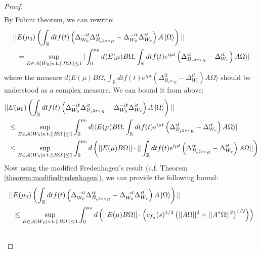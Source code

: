 \documentclass[a4paper,11pt]{article}
\theoremstyle{definition}
\newcommand{\lb}{\left(}
\newcommand{\rb}{\right)}
\begin{document}
{{\begin{proof}
\begin{align}
    \end{align}
    By Fubini theorem, we can rewrite:
    \begin{align}
        \begin{split}
            ||&E(\mu_0)\lb\int_\mathbb{R} dt f(t)\lb \Delta_{W_0}^{-it}\Delta_{B_{e^{2\pi s}R}}^{it} - \Delta_{W_0}^{-it}\Delta_{W_r}^{it} \rb A\ket{\Omega}\rb||
            \\&
            =\sup_{B\in\mathcal{A}(W_0)\text{s.t.}||B\Omega||\leq 1}|\int_0^{\mu_0} d\langle E(\mu)B\Omega, \int_\mathbb{R} dt f(t)e^{i\mu t}\lb\Delta_{B_{e^{2\pi s}R}}^{it} - \Delta_{W_r}^{it}\rb A\Omega\rangle|
        \end{split}
    \end{align}
    where the measure $d\langle E(\mu)B\Omega, \int_\mathbb{R} dt f(t)e^{i\mu t}\lb\Delta_{B_{e^{2\pi s}R}}^{it} - \Delta_{W_r}^{it}\rb A\Omega\rangle$ should be understood as a complex measure. We can bound it from above:
    \begin{align}
        \begin{split}
            ||&E(\mu_0)\lb\int_\mathbb{R} dt f(t)\lb \Delta_{W_0}^{-it}\Delta_{B_{e^{2\pi s}R}}^{it} - \Delta_{W_0}^{-it}\Delta_{W_r}^{it} \rb A\ket{\Omega}\rb||
            \\&
            \leq\sup_{B\in\mathcal{A}(W_0)\text{s.t.}||B\Omega||\leq 1}\int_0^{\mu_0} d|\langle E(\mu)B\Omega, \int_\mathbb{R} dt f(t)e^{i\mu t}\lb\Delta_{B_{e^{2\pi s}R}}^{it} - \Delta_{W_r}^{it}\rb A\Omega\rangle|
            \\&
            \leq\sup_{B\in\mathcal{A}(W_0)\text{s.t.}||B\Omega||\leq 1}\int_0^{\mu_0}d\lb||E(\mu)B\Omega||\cdot||\int_\mathbb{R} dt f(t)e^{i\mu t}\lb\Delta^{it}_{B_{e^{2\pi s}R}} - \Delta^{it}_{W_r}\rb A\Omega||\rb
        \end{split}
    \end{align}
    Now using the modified Fredenhagen's result (c.f. Theorem \ref{theorem:modifiedfredenhagen}), we can provide the following bound:
    \begin{align}
        \begin{split}
            ||&E(\mu_0)\lb\int_\mathbb{R} dt f(t)\lb \Delta_{W_0}^{-it}\Delta_{B_{e^{2\pi s}R}}^{it} - \Delta_{W_0}^{-it}\Delta_{W_r}^{it} \rb A\ket{\Omega}\rb||
            \\&
            \leq \sup_{B\in\mathcal{A}(W_0)\text{s.t.}||B\Omega||\leq 1}\int_0^{\mu_0}d\lb||E(\mu)B\Omega||\cdot \lb c_{f_\mu}(s)^{1/2}\lb ||A\Omega||^2 + ||A^*\Omega||^2 \rb^{1/2}\rb\rb
            \\&

\end{split}
\end{align}
\end{proof}}}
\end{document}
